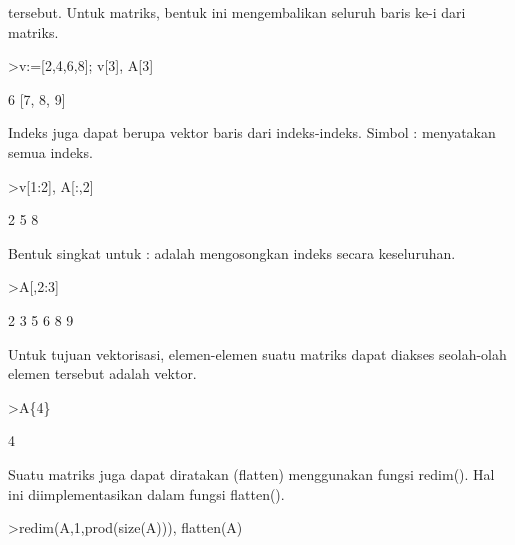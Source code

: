 \documentclass{article}
\newenvironment{eulernotebook}{\par}{\par}
\newenvironment{eulercomment}{\par\medskip}{\par\medskip}
\begin{document}
\begin{eulernotebook}
\begin{eulercomment}
\begin{eulercomment}
\begin{eulercomment}
\begin{eulercomment}
\begin{eulercomment}
\begin{eulercomment}
\begin{eulercomment}
tersebut. Untuk matriks, bentuk ini mengembalikan seluruh baris ke-i
dari matriks.
\end{eulercomment}
\begin{eulerprompt}
>v:=[2,4,6,8]; v[3], A[3]
\end{eulerprompt}
\begin{euleroutput}
  6
  [7,  8,  9]
\end{euleroutput}
\begin{eulercomment}
Indeks juga dapat berupa vektor baris dari indeks-indeks. Simbol :
menyatakan semua indeks.
\end{eulercomment}
\begin{eulerprompt}
>v[1:2], A[:,2]
\end{eulerprompt}
\begin{euleroutput}
  [2,  4]
              2 
              5 
              8 
\end{euleroutput}
\begin{eulercomment}
Bentuk singkat untuk : adalah mengosongkan indeks secara keseluruhan.
\end{eulercomment}
\begin{eulerprompt}
>A[,2:3]
\end{eulerprompt}
\begin{euleroutput}
              2             3 
              5             6 
              8             9 
\end{euleroutput}
\begin{eulercomment}
Untuk tujuan vektorisasi, elemen-elemen suatu matriks dapat diakses
seolah-olah elemen tersebut adalah vektor.
\end{eulercomment}
\begin{eulerprompt}
>A\{4\}
\end{eulerprompt}
\begin{euleroutput}
  4
\end{euleroutput}
\begin{eulercomment}
Suatu matriks juga dapat diratakan (flatten) menggunakan fungsi
redim(). Hal ini diimplementasikan dalam fungsi flatten().
\end{eulercomment}
\begin{eulerprompt}
>redim(A,1,prod(size(A))), flatten(A)
\end{eulerprompt}
\begin{euleroutput}
  [1,  2,  3,  4,  5,  6,  7,  8,  9]
  [1,  2,  3,  4,  5,  6,  7,  8,  9]
\end{euleroutput}
\begin{eulercomment}

\end{eulercomment}
\end{eulercomment}
\end{eulercomment}
\end{eulercomment}
\end{eulercomment}
\end{eulercomment}
\end{eulercomment}
\end{eulernotebook}
\end{document}
